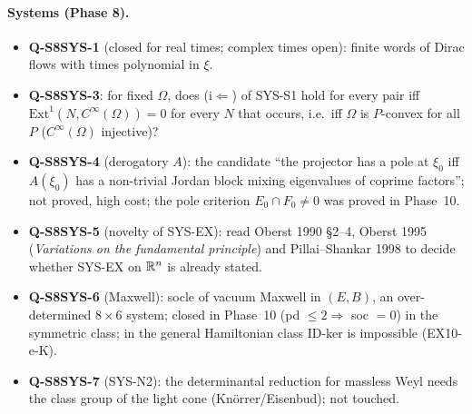 \paragraph{Systems (Phase 8).}
\begin{itemize}
\item \textbf{Q-S8SYS-1} (closed for real times; complex times open): finite words of Dirac flows with times polynomial in $\xi$.
\item \textbf{Q-S8SYS-3}: for fixed $\Omega$, does (i$\Leftarrow$) of SYS-S1 hold for every pair iff $\mathrm{Ext}^1(N,C^\infty(\Omega))=0$ for every $N$ that occurs, i.e.\ iff $\Omega$ is $P$-convex for all $P$ ($C^\infty(\Omega)$ injective)?
\item \textbf{Q-S8SYS-4} (derogatory $A$): the candidate ``the projector has a pole at $\xi_0$ iff $A(\xi_0)$ has a non-trivial Jordan block mixing eigenvalues of coprime factors''; not proved, high cost; the pole criterion $E_0\cap F_0\ne0$ was proved in Phase~10.
\item \textbf{Q-S8SYS-5} (novelty of SYS-EX): read Oberst 1990 \S2--4, Oberst 1995 (\emph{Variations on the fundamental principle}) and Pillai--Shankar 1998 to decide whether SYS-EX on $\mathbb{R}^n$ is already stated.
\item \textbf{Q-S8SYS-6} (Maxwell): socle of vacuum Maxwell in $(E,B)$, an over-determined $8\times6$ system; closed in Phase~10 (pd $\le2\Rightarrow$ soc $=0$) in the symmetric class; in the general Hamiltonian class ID-ker is impossible (EX10-e-K).
\item \textbf{Q-S8SYS-7} (SYS-N2): the determinantal reduction for massless Weyl needs the class group of the light cone (Kn\"orrer/Eisenbud); not touched.
\end{itemize}

